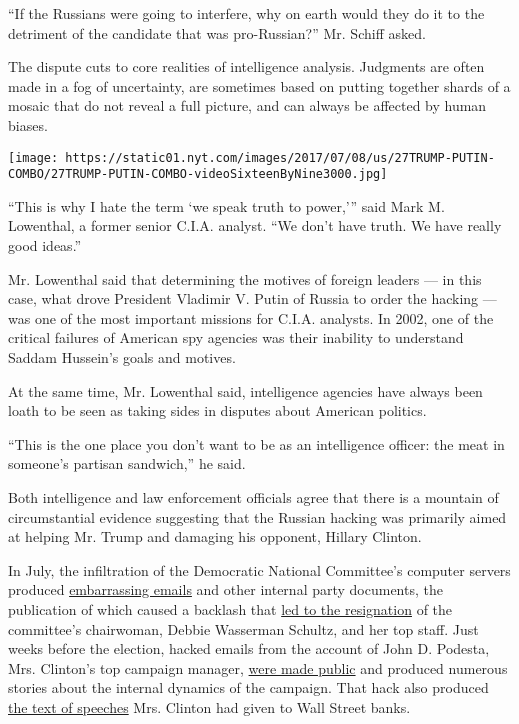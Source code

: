 ``If the Russians were going to interfere, why on earth would they do it
to the detriment of the candidate that was pro-Russian?'' Mr. Schiff
asked.

The dispute cuts to core realities of intelligence analysis. Judgments
are often made in a fog of uncertainty, are sometimes based on putting
together shards of a mosaic that do not reveal a full picture, and can
always be affected by human biases.

\texttt{[image: https://static01.nyt.com/images/2017/07/08/us/27TRUMP-PUTIN-COMBO/27TRUMP-PUTIN-COMBO-videoSixteenByNine3000.jpg]}

``This is why I hate the term `we speak truth to power,''' said Mark M.
Lowenthal, a former senior C.I.A. analyst. ``We don't have truth. We
have really good ideas.''

Mr. Lowenthal said that determining the motives of foreign leaders ---
in this case, what drove President Vladimir V. Putin of Russia to order
the hacking --- was one of the most important missions for C.I.A.
analysts. In 2002, one of the critical failures of American spy agencies
was their inability to understand Saddam Hussein's goals and motives.

At the same time, Mr. Lowenthal said, intelligence agencies have always
been loath to be seen as taking sides in disputes about American
politics.

``This is the one place you don't want to be as an intelligence officer:
the meat in someone's partisan sandwich,'' he said.

Both intelligence and law enforcement officials agree that there is a
mountain of circumstantial evidence suggesting that the Russian hacking
was primarily aimed at helping Mr. Trump and damaging his opponent,
Hillary Clinton.

In July, the infiltration of the Democratic National Committee's
computer servers produced
\href{http://www.nytimes.com/2016/07/23/us/politics/dnc-emails-sanders-clinton.html}{embarrassing
emails} and other internal party documents, the publication of which
caused a backlash that
\href{http://www.nytimes.com/2016/07/25/us/politics/debbie-wasserman-schultz-dnc-wikileaks-emails.html}{led
to the resignation} of the committee's chairwoman, Debbie Wasserman
Schultz, and her top staff. Just weeks before the election, hacked
emails from the account of John D. Podesta, Mrs. Clinton's top campaign
manager,
\href{https://www.nytimes.com/2016/10/21/us/private-security-group-says-russia-was-behind-john-podestas-email-hack.html}{were
made public} and produced numerous stories about the internal dynamics
of the campaign. That hack also produced
\href{http://www.nytimes.com/2016/10/08/us/politics/hillary-clinton-speeches-wikileaks.html}{the
text of speeches} Mrs. Clinton had given to Wall Street banks.

